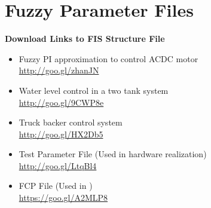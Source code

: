 \newappendix\label{secondappendix}
\section{Fuzzy Parameter Files}

\textbf{Download Links to FIS Structure File}
\begin{itemize}
	\item Fuzzy PI approximation to control ACDC motor\\
	\url{http://goo.gl/zhanJN}
	\item Water level control in a two tank system \\
	\url{http://goo.gl/9CWP8e}	
	\item Truck backer control system \\
	\url{http://goo.gl/HX2Db5}
	\item Test Parameter File (Used in hardware realization) \label{App:testFile}\\
	\url{http://goo.gl/LtqBl4}
	\item FCP File (Used in \cite{Suratia2012}) \label{App:AdityaFile}\\
	\url{https://goo.gl/A2MLP8}
\end{itemize}
